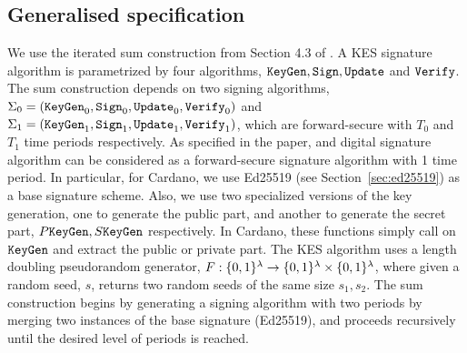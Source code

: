 \subsection{Generalised specification}
\newcommand{\update}{\texttt{Update}}
\newcommand{\pkeygen}{P\keygen}
\newcommand{\skeygen}{S\keygen}
\newcommand{\prf}{F}
\newcommand{\seed}{r}
\newcommand{\accept}{\texttt{true}}
\newcommand{\reject}{\texttt{false}}
We use the iterated sum construction from Section 4.3 of \cite{cryptoeprint:2001:034}.
A KES signature algorithm is parametrized by four algorithms, $\keygen, \sign, \update$ and $\texttt{Verify}$. The sum construction depends on two signing algorithms, $\Sigma_0 = (\keygen_0, \sign_0, \allowbreak\update_0, \verify_0)$ and $\Sigma_1 = (\keygen_1, \sign_1, \update_1, \verify_1)$, which are forward-secure with $T_0$ and $T_1$ time periods respectively. As specified in the paper, and digital signature algorithm can be considered as a forward-secure signature algorithm with 1 time period. In particular, for Cardano, we use Ed25519 (see Section~\ref{sec:ed25519}) as a base signature scheme. Also, we use two specialized versions of the key generation, one to generate the public
part, and another to generate the secret part, $\pkeygen, \skeygen$ respectively. In Cardano, 
these functions simply call on $\texttt{KeyGen}$ and extract the public or private part. The KES algorithm
uses a length doubling pseudorandom generator, $\prf:\{0,1\}^{\secparam}\rightarrow\{0,1\}^{\secparam}\times\{0,1\}^{\secparam}$, where given a random seed, $s$, returns two random seeds of the same size $s_1, s_2$. The sum construction begins by generating a signing algorithm with two periods by merging two instances of the base signature (Ed25519), and proceeds recursively until the desired level of periods is reached. 
